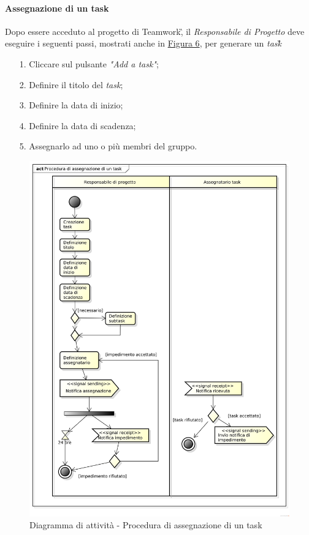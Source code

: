 \paragraph{Assegnazione di un task}
Dopo essere acceduto al progetto di Teamwork\G, il \textit{Responsabile di Progetto} deve eseguire i seguenti passi, mostrati anche in \hyperref[sec:Figura6]{Figura 6}, per generare un \textit{task}\G\:
\begin{itemize}
\item [1.] Cliccare sul pulsante \textit{"Add a task"};
\item [2.] Definire il titolo del \textit{task};
\item [3.] Definire la data di inizio;
\item [4.] Definire la data di scadenza;
\item [5.] Assegnarlo ad uno o più membri del gruppo.
\end{itemize}

\begin{figure}[htbp]
\centering
\includegraphics[scale=0.5]{immagini/procedura_di_assegnazione_di_un_task.png}
\captionsetup{labelfont=bf}
\caption{Diagramma di attività - Procedura di assegnazione di un task}\label{sec:Figura6}
\end{figure}

